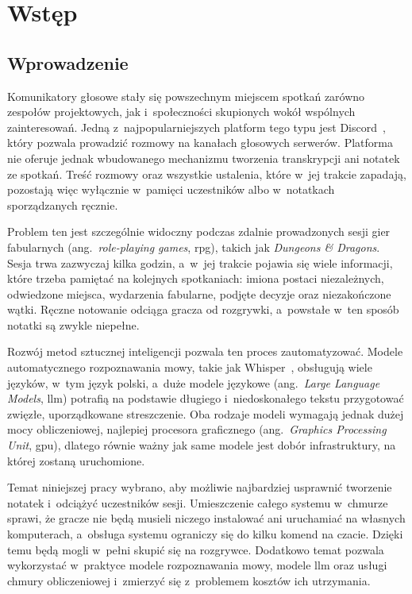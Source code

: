 \chapter{Wstęp}
\label{chap:wstep}
\section{Wprowadzenie}
\label{sec:wstep:wprowadzenie}

Komunikatory głosowe stały się powszechnym miejscem spotkań zarówno zespołów
projektowych, jak i~społeczności skupionych wokół wspólnych zainteresowań.
Jedną z~najpopularniejszych platform tego typu jest Discord~\cite{Discord},
który pozwala prowadzić rozmowy na kanałach głosowych serwerów. Platforma nie
oferuje jednak wbudowanego mechanizmu tworzenia transkrypcji ani notatek ze
spotkań. Treść rozmowy oraz wszystkie ustalenia, które w~jej trakcie zapadają,
pozostają więc wyłącznie w~pamięci uczestników albo w~notatkach sporządzanych ręcznie.

Problem ten jest szczególnie widoczny podczas zdalnie prowadzonych sesji gier
fabularnych (ang.~\textit{role-playing games}, \acs{rpg}), takich jak
\textit{Dungeons \& Dragons}. Sesja trwa zazwyczaj kilka godzin, a~w~jej trakcie
pojawia się wiele informacji, które trzeba pamiętać na kolejnych spotkaniach:
imiona postaci niezależnych, odwiedzone miejsca, wydarzenia fabularne, podjęte
decyzje oraz niezakończone wątki. Ręczne notowanie odciąga gracza od
rozgrywki, a~powstałe w~ten sposób notatki są zwykle niepełne.

Rozwój metod sztucznej inteligencji pozwala ten proces zautomatyzować. Modele
automatycznego rozpoznawania mowy, takie jak Whisper~\cite{Whisper}, obsługują
wiele języków, w~tym język polski, a~duże modele językowe (ang.~\textit{Large
Language Models}, \acs{llm}) potrafią na podstawie długiego i~niedoskonałego
tekstu przygotować zwięzłe, uporządkowane streszczenie. Oba rodzaje modeli
wymagają jednak dużej mocy obliczeniowej, najlepiej procesora graficznego
(ang.~\textit{Graphics Processing Unit}, \acs{gpu}), dlatego równie ważny jak
same modele jest dobór infrastruktury, na której zostaną uruchomione.

Temat niniejszej pracy wybrano, aby możliwie najbardziej usprawnić tworzenie
notatek i~odciążyć uczestników sesji. Umieszczenie całego systemu w~chmurze
sprawi, że gracze nie będą musieli niczego instalować ani uruchamiać na
własnych komputerach, a~obsługa systemu ograniczy się do kilku komend na
czacie. Dzięki temu będą mogli w~pełni skupić się na rozgrywce. Dodatkowo
temat pozwala wykorzystać w~praktyce modele rozpoznawania mowy, modele
\acs{llm} oraz usługi chmury obliczeniowej i~zmierzyć się z~problemem kosztów
ich utrzymania.

